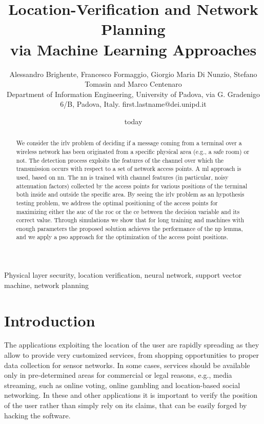 \documentclass[twocolumns]{IEEEtran}
\title{Location-Verification and Network Planning \\ via Machine Learning Approaches}
\author{Alessandro Brighente, Francesco Formaggio, Giorgio Maria Di Nunzio,  Stefano Tomasin and Marco Centenaro  \\ {\small Department of Information Engineering, University of Padova, via G. Gradenigo 6/B, Padova, Italy. first.lastname@dei.unipd.it} }
\date{today}
\begin{document}
\maketitle

\begin{abstract}
We consider the \ac{irlv} problem of deciding if a message coming from a terminal over a wireless network has been originated from a specific physical area (e.g., a safe room) or not. The detection process exploits the features of the channel over which the transmission occurs with respect to a set of network access points. A  \ac{ml} approach is used, based on \ac{nn}. The \ac{nn} is trained with channel features (in particular, noisy attenuation factors) collected by the access points for various positions of the terminal both inside and outside the specific area. By seeing the \ac{irlv} problem as an hypothesis testing problem, we address the optimal positioning of the access points for maximizing either the \ac{auc} of the \ac{roc} or  the \ac{ce} between the decision variable and its correct value. Through simulations we show that for long training and machines with enough parameters the proposed solution achieves the performance of the \ac{np} lemma, and we apply a \ac{pso} approach for the optimization of the access point positions.
\end{abstract}

\begin{IEEEkeywords}
Physical layer security, location verification, neural network, support vector machine, network planning
\end{IEEEkeywords}
\glsresetall

\section{Introduction}

The applications exploiting the location of the user are rapidly spreading as they allow to provide very customized services, from shopping opportunities to proper data collection for sensor networks. In some cases, services should be available only in pre-determined areas for commercial or legal reasons, e.g., media streaming, such as online voting, online gambling and location-based social networking. In these and other applications it is important to verify the position of the user rather than simply rely on its claims, that can be easily forged by hacking the software.
\end{document}
